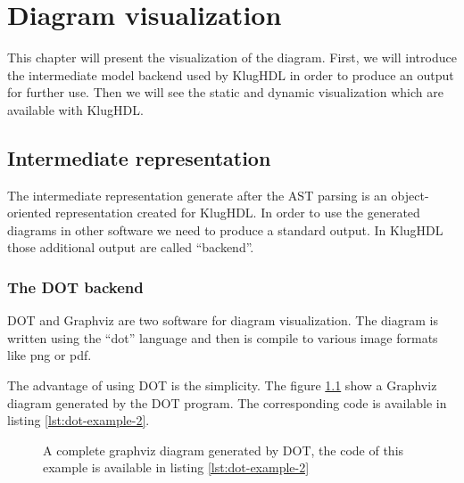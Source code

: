 \chapter{Diagram visualization}
\label{chap:diagram-visualization}

This chapter will present the visualization of the diagram. First, we will
introduce the intermediate model backend used by KlugHDL in order to produce an
output for further use. Then we will see the static and dynamic visualization
which are available with KlugHDL.

\section{Intermediate representation}
\label{sec:intermediate-representation}

The intermediate representation generate after the AST parsing is an
object-oriented representation created for KlugHDL. In order to use the
generated diagrams in other software we need to produce a standard output. In
KlugHDL those additional output are called ``backend''.

\subsection{The DOT backend}
\label{sec:dot-backend}

DOT and Graphviz are two software for diagram visualization. The diagram is
written using the ``dot'' language and then is compile to various image formats
like png or pdf.

The advantage of using DOT is the simplicity. The figure \ref{fig:dot-example-2}
show a Graphviz diagram generated by the DOT program. The corresponding code is
available in listing \ref{lst:dot-example-2}.

\begin{figure}[H]
  \centering
  \caption[Example of a Graphviz diagram]{A complete graphviz diagram generated
    by DOT, the code of this example is available in listing \ref{lst:dot-example-2}}
  \label{fig:dot-example-2}
\end{figure}

